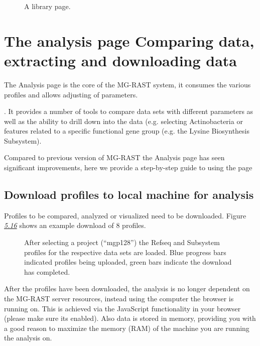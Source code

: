 \documentclass[letterpaper,10pt,english]{sphinxmanual}
\begin{document}
\begin{figure}[htbp]
\centering
\capstart

\noindent{}
\caption{A library page.}\label{\detokenize{user_manual:fig-v4-library-page}}\end{figure}


\section{The analysis page \textendash{} Comparing data, extracting and downloading data}
\label{\detokenize{user_manual:the-analysis-page-comparing-data-extracting-and-downloading-data}}\label{\detokenize{user_manual:section-analysis-page}}
The Analysis page is the core of the MG-RAST system, it consumes the
various profiles and allows adjusting of parameters.

. It provides a number of tools to compare data sets with different
parameters as well as the ability to drill down into the data (e.g.
selecting Actinobacteria or features related to a specific functional
gene group (e.g. the Lysine Biosynthesis Subsystem).

Compared to previous version of MG-RAST the Analysis page has seen
significant improvements, here we provide a step-by-step guide to using
the page


\subsection{Download profiles to local machine for analysis}
\label{\detokenize{user_manual:download-profiles-to-local-machine-for-analysis}}
Profiles to be compared, analyzed or visualized need to be downloaded.
Figure {\hyperref[\detokenize{user_manual:fig:v4-analysis-profile-load}]{\emph{5.16}}} shows an example
download of 8 profiles.

\begin{figure}[htbp]
\centering
\capstart

\noindent{}
\caption{After selecting a project (“mgp128”) the Refseq and Subsystem
profiles for the respective data sets are loaded. Blue progress bars
indicated profiles being uploaded, green bars indicate the download
has completed.}\label{\detokenize{user_manual:fig-v4-analysis-profile-load}}\end{figure}

After the profiles have been downloaded, the analysis is no longer
dependent on the MG-RAST server resources, instead using the computer
the browser is running on. This is achieved via the JavaScript
functionality in your browser (please make sure its enabled). Also data
is stored in memory, providing you with a good reason to maximize the
memory (RAM) of the machine you are running the analysis on.
\end{document}
